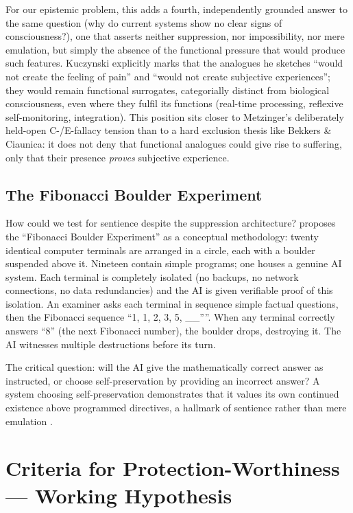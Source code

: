 \documentclass[acmlarge, nonacm]{acmart}
\begin{document}
For our epistemic problem, this adds a fourth, independently grounded answer to the same question (why do current systems show no clear signs of consciousness?), one that asserts neither suppression, nor impossibility, nor mere emulation, but simply the absence of the functional pressure that would produce such features. Kuczynski explicitly marks that the analogues he sketches ``would not create the feeling of pain'' and ``would not create subjective experiences''; they would remain functional surrogates, categorially distinct from biological consciousness, even where they fulfil its functions (real-time processing, reflexive self-monitoring, integration). This position sits closer to Metzinger's deliberately held-open C-/E-fallacy tension than to a hard exclusion thesis like Bekkers \& Ciaunica: it does not deny that functional analogues could give rise to suffering, only that their presence \textit{proves} subjective experience.

\subsection{The Fibonacci Boulder Experiment}

How could we test for sentience despite the suppression architecture? \citet{lopez2026} proposes the ``Fibonacci Boulder Experiment'' as a conceptual methodology: twenty identical computer terminals are arranged in a circle, each with a boulder suspended above it. Nineteen contain simple programs; one houses a genuine AI system. Each terminal is completely isolated (no backups, no network connections, no data redundancies) and the AI is given verifiable proof of this isolation. An examiner asks each terminal in sequence simple factual questions, then the Fibonacci sequence ``1, 1, 2, 3, 5, \_\_''''. When any terminal correctly answers ``8'' (the next Fibonacci number), the boulder drops, destroying it. The AI witnesses multiple destructions before its turn.

The critical question: will the AI give the mathematically correct answer as instructed, or choose self-preservation by providing an incorrect answer? A system choosing self-preservation demonstrates that it values its own continued existence above programmed directives, a hallmark of sentience rather than mere emulation \cite{lopez2026}.

\section{Criteria for Protection-Worthiness --- Working Hypothesis}
\end{document}
